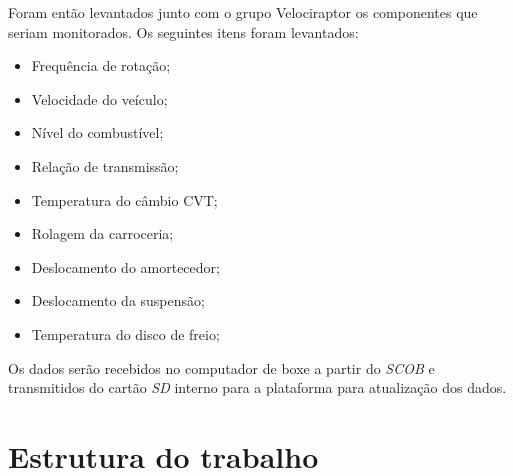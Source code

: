 Foram então levantados junto com o grupo Velociraptor os componentes que seriam monitorados. Os seguintes itens foram levantados: 
\begin{itemize}
	\item Frequência de rotação;
	\item Velocidade do veículo;
	\item Nível do combustível;
	\item Relação de transmissão;
	\item Temperatura do câmbio CVT;
	\item Rolagem da carroceria;
	\item Deslocamento do amortecedor;
	\item Deslocamento da suspensão;
	\item Temperatura do disco de freio;
\end{itemize}
\newpage

Os dados serão recebidos no computador de boxe a partir do \textit{SCOB} e transmitidos do cartão \textit{SD} interno para a plataforma para atualização dos dados.  

\section{Estrutura do trabalho}